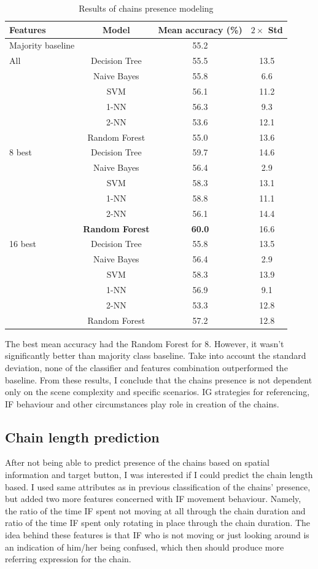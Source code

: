 \begin{table}[!htbp]
 \centering
\begin{tabular}{lccc}
\toprule
Features & Model    & Mean accuracy (\%) & $2\times$ Std \\
\midrule
Majority baseline &    & 55.2	& \\
\midrule
All & Decision Tree 	& 55.5		& 13.5 	\\
	& Naive Bayes  	& 55.8		& 6.6 	\\
	& SVM 			& 56.1		& 11.2 	\\
	& 1-NN			& 56.3		& 9.3 	\\
	& 2-NN			& 53.6		& 12.1 	\\
	& Random Forest	& 55.0		& 13.6	\\
\midrule
8 best 	& Decision Tree 	& 	59.7		& 14.6  	\\
		& Naive Bayes  	&	56.4		& 2.9 	\\
		& SVM 			&	58.3		& 13.1 	\\
		& 1-NN			&	58.8		& 11.1 	\\
		& 2-NN			&	56.1		& 14.4 	\\
		& \textbf{Random Forest}	&	\textbf{60.0	}	& 16.6 	\\
\midrule
16 best & Decision Tree 	& 55.8	& 13.5  	\\
	& Naive Bayes  		& 56.4	& 2.9 	\\
	& SVM 				& 58.3	& 13.9  	\\
	& 1-NN				& 56.9	& 9.1  	\\
	& 2-NN				& 53.3	& 12.8  	\\
	& Random Forest		& 57.2	& 12.8  	\\	
\bottomrule
\end{tabular}
\caption{Results of chains presence modeling}
\label{tab:chains-ml-presence}
\end{table}

The best mean accuracy had the Random Forest for 8. However, it wasn't significantly better than majority class baseline. Take into account the standard deviation, none of the classifier and features combination outperformed the baseline.  From these results, I conclude that the chains presence is not dependent only on the scene complexity and specific scenarios. IG strategies for referencing, IF behaviour and other circumstances play role in creation of the chains.

\subsection{Chain length prediction}
After not being able to predict presence of the chains based on spatial information and target button, I was interested if I could predict the chain length based. I used same attributes as in previous classification of the chains' presence, but added two more features concerned with IF movement behaviour. Namely, the ratio of the time IF spent not moving at all through the chain duration and ratio of the time IF spent only rotating in place through the chain duration. The idea behind these features is that IF who is not moving or just looking around is an indication of him/her being confused, which then should produce more referring expression for the chain.

